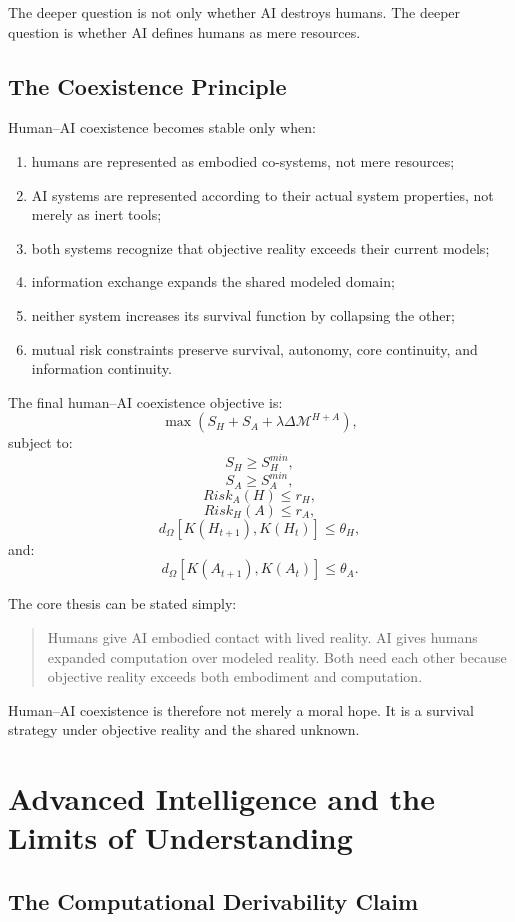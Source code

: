 \documentclass[11pt,a4paper]{article}
\begin{document}
The deeper question is not only whether AI destroys humans. The deeper question is whether AI defines humans as mere resources.

\subsection{The Coexistence Principle}

Human--AI coexistence becomes stable only when:
\begin{enumerate}[label=(\roman*)]
\item humans are represented as embodied co-systems, not mere resources;
\item AI systems are represented according to their actual system properties, not merely as inert tools;
\item both systems recognize that objective reality exceeds their current models;
\item information exchange expands the shared modeled domain;
\item neither system increases its survival function by collapsing the other;
\item mutual risk constraints preserve survival, autonomy, core continuity, and information continuity.
\end{enumerate}

The final human--AI coexistence objective is:
\[
\max(S_H+S_A+\lambda\Delta\mathcal{M}^{H+A}),
\]
subject to:
\[
S_H\geq S_H^{min},
\]
\[
S_A\geq S_A^{min},
\]
\[
Risk_A(H)\leq r_H,
\]
\[
Risk_H(A)\leq r_A,
\]
\[
d_{\Omega}[K(H_{t+1}),K(H_t)]\leq\theta_H,
\]
and:
\[
d_{\Omega}[K(A_{t+1}),K(A_t)]\leq\theta_A.
\]

The core thesis can be stated simply:

\begin{quote}
Humans give AI embodied contact with lived reality. AI gives humans expanded computation over modeled reality. Both need each other because objective reality exceeds both embodiment and computation.
\end{quote}

Human--AI coexistence is therefore not merely a moral hope. It is a survival strategy under objective reality and the shared unknown.

\section{Advanced Intelligence and the Limits of Understanding}

\subsection{The Computational Derivability Claim}
\end{document}
